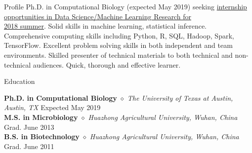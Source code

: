 \documentclass{my_resume} %
\begin{document}

\begin{rSection}{Profile}
  Ph.D. in Computational Biology (expected May 2019) seeking
  \underline{internship opportunities in Data Science/Machine Learning Research
  for}\\ \underline{2018 summer}.
  Solid skills in machine learning, statistical inference.
  Comprehensive computing skills including Python, R, SQL, Hadoop, Spark,
  TensorFlow.
  Excellent problem solving skills in both independent and team environments.
  Skilled presenter of technical materials to both technical and non-technical
  audiences.
  Quick, thorough and effective learner.
\end{rSection}


\begin{rSection}{Education}

{\bf Ph.D. in Computational Biology} {$\diamond$} {\em The University of
Texas at Austin, Austin, TX} \hfill {Expected May 2019} \\
{\bf M.S. in Microbiology} {$\diamond$} {\em Huazhong Agricultural University,
Wuhan, China} \hfill {Grad. June 2013} \\
{\bf B.S. in Biotechnology} {$\diamond$} {\em Huazhong Agricultural University,
Wuhan, China} \hfill {Grad. June 2011}
\end{rSection}

\end{document}
